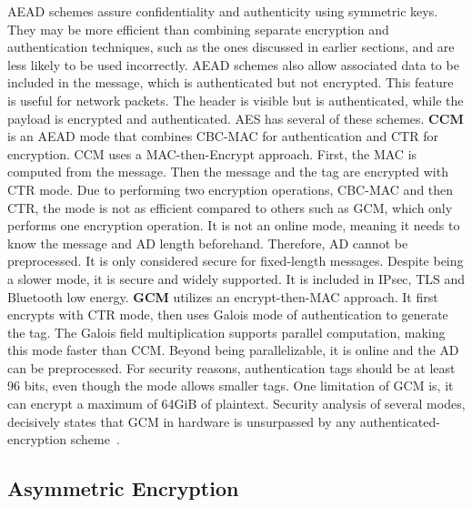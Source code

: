 \ac{AEAD} schemes assure confidentiality and authenticity using symmetric keys. They may be more efficient than combining separate encryption and authentication techniques, such as the ones discussed in earlier sections, and are less likely to be used incorrectly. \ac{AEAD} schemes also allow associated data to be included in the message, which is authenticated but not encrypted. This feature is useful for network packets. The header is visible but is authenticated, while the payload is encrypted and authenticated. 
\ac{AES} has several of these schemes. \textbf{\ac{CCM}} is an \ac{AEAD} mode that combines \ac{CBC-MAC} for authentication and \ac{CTR} for encryption.
\ac{CCM} uses a MAC-then-Encrypt approach. First, the \ac{MAC} is computed from the message. Then the message and the tag are encrypted with \ac{CTR} mode.
Due to performing two encryption operations, \ac{CBC-MAC} and then \ac{CTR}, the mode is not as efficient compared to others such as \ac{GCM}, which only performs one encryption operation.
It is not an online mode, meaning it needs to know the message and \ac{AD} length beforehand. Therefore, \ac{AD} cannot be preprocessed. It is only considered secure for fixed-length messages.
Despite being a slower mode, it is secure and widely supported. It is included in \ac{IPsec}, \ac{TLS} and Bluetooth low energy.
\textbf{\ac{GCM}} utilizes an encrypt-then-MAC approach. It first encrypts with \ac{CTR} mode, then uses Galois mode of authentication to generate the tag. The Galois field multiplication supports parallel computation, making this mode faster than \ac{CCM}.
Beyond being parallelizable, it is online and the \ac{AD} can be preprocessed.
For security reasons, authentication tags should be at least 96 bits, even though the mode allows smaller tags. One limitation of \ac{GCM} is, it can encrypt a maximum of 64GiB of plaintext. Security analysis of several modes, decisively states that \ac{GCM} in hardware is unsurpassed by any authenticated-encryption scheme~\cite{aesmodes}.



\subsection{Asymmetric Encryption}\label{chap:background:crypto:assymetric}

